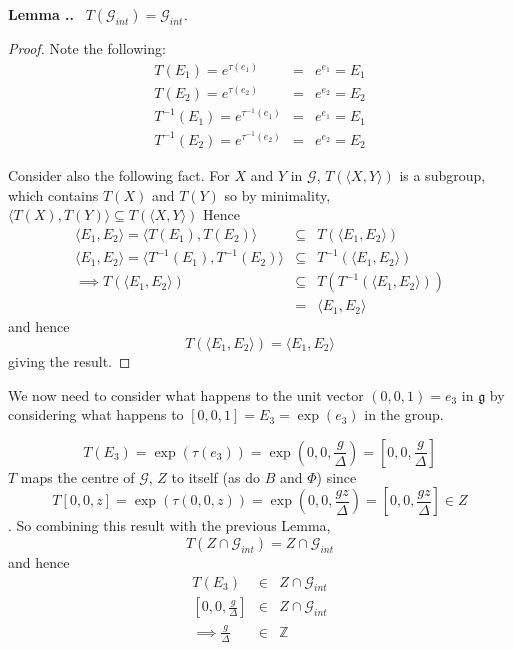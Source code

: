 \documentclass[honours]{UNSWthesis}
\newcommand{\Z}{\mathbb{Z}}
\newcommand{\G}{\mathcal{G}}
\newcommand{\g}{\mathfrak{g}}
\newcommand{\1}{\mathbf{e}_{1}}
\newcommand{\2}{\mathbf{e}_{3}}
\newcommand{\3}{\mathbf{e}_{3}}
\newcounter{Item}[section]
\newenvironment{Lemma}{\medskip
                            \refstepcounter{Item}
                            \noindent
                           {\bf Lemma \thesection.\theItem.}\ %
                            \begingroup \sl}
                           {\endgroup\medskip}
\begin{document}
\begin{Lemma}
$T(\G_{int})=\G_{int}$. 
\end{Lemma}

\begin{proof}
Note the following:
\begin{eqnarray*}
T(E_{1})= e^{\tau (e_{1})} &=& e^{e_{1}} = E_{1} \\
T(E_{2})= e^{\tau (e_{2})} &=& e^{e_{2}} = E_{2} \\
T^{-1}(E_{1})= e^{\tau^{-1} (e_{1})} &=& e^{e_{1}} = E_{1} \\
T^{-1}(E_{2})= e^{\tau^{-1} (e_{2})} &=& e^{e_{2}} = E_{2} 
\end{eqnarray*}

Consider also the following fact. For $X$ and $Y$ in $\G$, $T( \langle X,Y \rangle )$ is a subgroup, which contains $T(X)$ and $T(Y)$ so by minimality, $\langle T(X),T(Y) \rangle \subseteq T( \langle X,Y \rangle )$
Hence
\begin{eqnarray*}
\langle E_{1},E_{2} \rangle = \langle T(E_{1}),T(E_{2}) \rangle &\subseteq & T( \langle E_{1},E_{2} \rangle) \\
\langle E_{1},E_{2} \rangle = \langle T^{-1}(E_{1}),T^{-1}(E_{2}) \rangle & \subseteq & T^{-1}( \langle E_{1},E_{2} \rangle) \\
\implies T( \langle E_{1},E_{2} \rangle) & \subseteq & T(T^{-1}( \langle E_{1},E_{2} \rangle))\\
&=&\langle E_{1},E_{2} \rangle
\end{eqnarray*}
and hence 
\[
T( \langle E_{1},E_{2} \rangle)= \langle E_{1},E_{2}\rangle
\]
giving the result.
\end{proof}

We now need to consider what happens to the unit vector $(0,0,1)=e_{3}$ in $\g$ by considering what happens to $[0,0,1]=E_{3}=\exp(e_{3})$ in the group.

\[
T(E_{3})= \exp(\tau (e_{3}))=\exp(0,0,\frac{g}{\Delta})=[0,0,\frac{g}{\Delta}]
\]
$T$ maps the centre of $\G$, $Z$ to itself (as do $B$ and $\Phi$) since 
\[
T[0,0,z]= \exp(\tau(0,0,z))= \exp(0,0,\frac{gz}{\Delta})=[0,0,\frac{gz}{\Delta}] \in Z
\]. So combining this result with the previous Lemma,
\[
T( Z \cap \G_{int})=Z \cap \G_{int}
\]
and hence 
\begin{eqnarray*}
T(E_{3}) &\in & Z \cap \G_{int} \\
\left[ 0,0,\frac{g}{\Delta} \right] &\in & Z \cap \G_{int} \\
\implies \frac{g}{\Delta} &\in & \Z
\end{eqnarray*}
\end{document}
